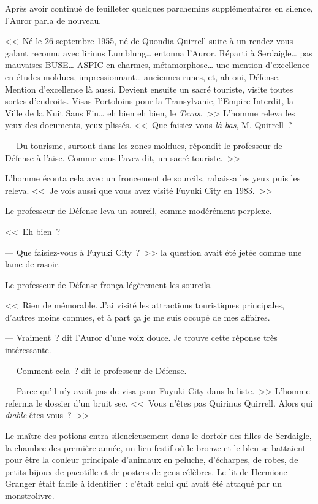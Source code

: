 Après avoir continué de feuilleter quelques parchemins supplémentaires en silence, l'Auror parla de nouveau.

<<~Né le 26 septembre 1955, né de Quondia Quirrell suite à un rendez-vous galant reconnu avec lirinus Lumblung… entonna l'Auror. Réparti à Serdaigle… pas mauvaises BUSE… ASPIC en charmes, métamorphose… une mention d'excellence en études moldues, impressionnant… anciennes runes, et, ah oui, Défense. Mention d'excellence là aussi. Devient ensuite un sacré touriste, visite toutes sortes d'endroits. Visas Portoloins pour la Transylvanie, l'Empire Interdit, la Ville de la Nuit Sans Fin… eh bien eh bien, le \emph{Texas}.~>> L'homme releva les yeux des documents, yeux plissés. <<~Que faisiez-vous \emph{là-bas}, M. Quirrell~?

--- Du tourisme, surtout dans les zones moldues, répondit le professeur de Défense à l'aise. Comme vous l'avez dit, un sacré touriste.~>>

L'homme écouta cela avec un froncement de sourcils, rabaissa les yeux puis les releva. <<~Je vois aussi que vous avez visité Fuyuki City en 1983.~>>

Le professeur de Défense leva un sourcil, comme modérément perplexe.

<<~Eh bien~?

--- Que faisiez-vous à Fuyuki City~?~>> la question avait été jetée comme une lame de rasoir.

Le professeur de Défense fronça légèrement les sourcils.

<<~Rien de mémorable. J'ai visité les attractions touristiques principales, d'autres moins connues, et à part ça je me suis occupé de mes affaires.

--- Vraiment~? dit l'Auror d'une voix douce. Je trouve cette réponse très intéressante.

--- Comment cela~? dit le professeur de Défense.

--- Parce qu'il n'y avait pas de visa pour Fuyuki City dans la liste.~>> L'homme referma le dossier d'un bruit sec. <<~Vous n'êtes pas Quirinus Quirrell. Alors qui \emph{diable} êtes-vous~?~>>

\later

Le maître des potions entra silencieusement dans le dortoir des filles de Serdaigle, la chambre des première année, un lieu festif où le bronze et le bleu se battaient pour être la couleur principale d'animaux en peluche, d'écharpes, de robes, de petits bijoux de pacotille et de posters de gens célèbres. Le lit de Hermione Granger était facile à identifier~: c'était celui qui avait été attaqué par un monstrolivre.

